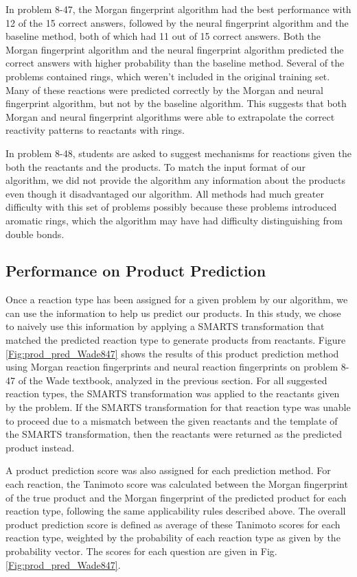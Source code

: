 In problem 8-47, the Morgan fingerprint algorithm had the best performance with 12 of the 15 correct answers, followed by the neural fingerprint algorithm and the baseline method, both of which had 11 out of 15 correct answers. Both the Morgan fingerprint algorithm and the neural fingerprint algorithm predicted the correct answers with higher probability than the baseline method. Several of the problems contained rings, which weren't included in the original training set. Many of these reactions were predicted correctly by the Morgan and neural fingerprint algorithm, but not by the baseline algorithm. This suggests that both Morgan and neural fingerprint algorithms were able to extrapolate the correct reactivity patterns to reactants with rings.

In problem 8-48, students are asked to suggest mechanisms for reactions given the both the reactants and the products. To match the input format of our algorithm, we did not provide the algorithm any information about the products even though it disadvantaged our algorithm. All methods had much greater difficulty with this set of problems possibly because these problems introduced aromatic rings, which the algorithm may have had difficulty distinguishing from double bonds.

\subsection{Performance on Product Prediction}

Once a reaction type has been assigned for a given problem by our algorithm, we can use the information to help us predict our products. In this study, we chose to naively use this information by applying a SMARTS transformation that matched the predicted reaction type to generate products from reactants. Figure \ref{Fig:prod_pred_Wade847} shows the results of this product prediction method using Morgan reaction fingerprints and neural reaction fingerprints on problem 8-47 of the Wade textbook, analyzed in the previous section. For all suggested reaction types, the SMARTS transformation was applied to the reactants given by the problem. If the SMARTS transformation for that reaction type was unable to proceed due to a mismatch between the given reactants and the template of the SMARTS transformation, then the reactants were returned as the predicted product instead. 

A product prediction score was also assigned for each prediction method. For each reaction, the Tanimoto score\cite{Bajusz_2015} was calculated between the Morgan fingerprint of the true product and the Morgan fingerprint of the predicted product for each reaction type, following the same applicability rules described above. The overall product prediction score is defined as average of these Tanimoto scores for each reaction type, weighted by the probability of each reaction type as given by the probability vector. The scores for each question are given in Fig. \ref{Fig:prod_pred_Wade847}.

